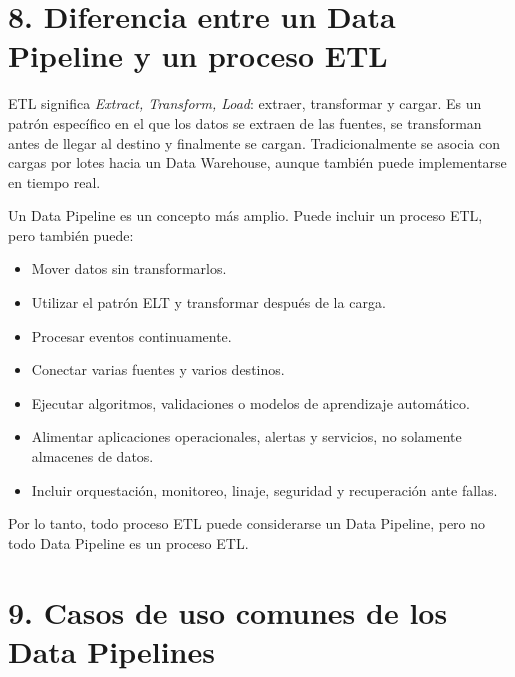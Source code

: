 \section*{8. Diferencia entre un Data Pipeline y un proceso ETL}

ETL significa \textit{Extract, Transform, Load}: extraer, transformar y cargar.
Es un patrón específico en el que los datos se extraen de las fuentes, se
transforman antes de llegar al destino y finalmente se cargan. Tradicionalmente
se asocia con cargas por lotes hacia un Data Warehouse, aunque también puede
implementarse en tiempo real.

Un Data Pipeline es un concepto más amplio. Puede incluir un proceso ETL, pero
también puede:

\begin{itemize}
    \item Mover datos sin transformarlos.
    \item Utilizar el patrón ELT y transformar después de la carga.
    \item Procesar eventos continuamente.
    \item Conectar varias fuentes y varios destinos.
    \item Ejecutar algoritmos, validaciones o modelos de aprendizaje automático.
    \item Alimentar aplicaciones operacionales, alertas y servicios, no solamente almacenes de datos.
    \item Incluir orquestación, monitoreo, linaje, seguridad y recuperación ante fallas.
\end{itemize}

Por lo tanto, todo proceso ETL puede considerarse un Data Pipeline, pero no todo
Data Pipeline es un proceso ETL.

\section*{9. Casos de uso comunes de los Data Pipelines}

